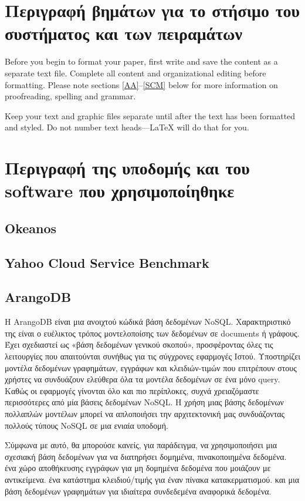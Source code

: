 \documentclass[conference]{IEEEtran}
\begin{document}
\section{Περιγραφή βημάτων για το στήσιμο του συστήματος και των πειραμάτων}
Before you begin to format your paper, first write and save the content as a 
separate text file. Complete all content and organizational editing before 
formatting. Please note sections \ref{AA}--\ref{SCM} below for more information on 
proofreading, spelling and grammar.

Keep your text and graphic files separate until after the text has been 
formatted and styled. Do not number text heads---{\LaTeX} will do that 
for you.

\section{Περιγραφή της υποδομής και του software που χρησιμοποίηθηκε}

\subsection{Okeanos} 

\subsection{Yahoo Cloud Service Benchmark}

\subsection{ArangoDB}
Η ArangoDB είναι μια ανοιχτού κώδικά βάση δεδομένων NoSQL. Χαρακτηριστικό της είναι ο ευέλικτος τρόπος μοντελοποίσης των δεδομένων σε documents ή γράφους. Έχει σχεδιαστεί ως «βάση δεδομένων γενικού σκοπού», προσφέροντας όλες τις λειτουργίες που απαιτούνται συνήθως για τις σύγχρονες εφαρμογές Ιστού. Υποστηρίζει μοντέλα δεδομένων γραφημάτων, εγγράφων και κλειδιών-τιμών που επιτρέπουν στους χρήστες να συνδυάζουν ελεύθερα όλα τα μοντέλα δεδομένων σε ένα μόνο query. Καθώς οι εφαρμογές γίνονται όλο και πιο περίπλοκες, συχνά χρειαζόμαστε περισσότερες από μία βάσεις δεδομένων NoSQL. Η χρήση μιας βάσης δεδομένων πολλαπλών μοντέλων μπορεί να απλοποιήσει την αρχιτεκτονική μας συνδυάζοντας πολλούς τύπους NoSQL σε μια ενιαία υποδομή.

Σύμφωνα με αυτό, θα μπορούσε κανείς, για παράδειγμα, να χρησιμοποιήσει μια σχεσιακή βάση δεδομένων για να διατηρήσει δομημένα, πινακοποιημένα δεδομένα. ένα χώρο αποθήκευσης εγγράφων για μη δομημένα δεδομένα που μοιάζουν με αντικείμενα. ένα κατάστημα κλειδιού/τιμής για έναν πίνακα κατακερματισμού. και μια βάση δεδομένων γραφημάτων για ιδιαίτερα συνδεδεμένα αναφορικά δεδομένα.
\end{document}
